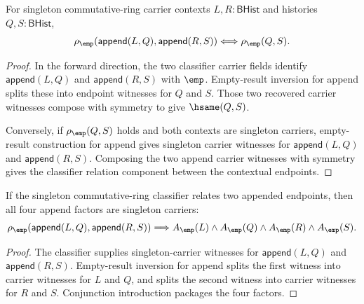 \begin{theorem}
\label{thm:commring-singleton-classifier-append-context-cancel}
For singleton commutative-ring carrier contexts $L,R:\mathsf{BHist}$ and
histories $Q,S:\mathsf{BHist}$,
$$
\rho_{\emp}(\mathsf{append}(L,Q),\mathsf{append}(R,S))
\Longleftrightarrow
\rho_{\emp}(Q,S).
$$
\end{theorem}
\begin{proof}
In the forward direction, the two classifier carrier fields identify
$\mathsf{append}(L,Q)$ and $\mathsf{append}(R,S)$ with $\emp$. Empty-result
inversion for append splits these into endpoint witnesses for $Q$ and $S$.
Those two recovered carrier witnesses compose with symmetry to give
$\hsame(Q,S)$.

Conversely, if $\rho_{\emp}(Q,S)$ holds and both contexts are singleton
carriers, empty-result construction for append gives singleton carrier
witnesses for $\mathsf{append}(L,Q)$ and $\mathsf{append}(R,S)$. Composing
the two append carrier witnesses with symmetry gives the classifier relation
component between the contextual endpoints.
\end{proof}

\begin{theorem}
\label{thm:commring-singleton-classifier-append-context-carrier-split}
If the singleton commutative-ring classifier relates two appended endpoints,
then all four append factors are singleton carriers:
$$
\rho_{\emp}(\mathsf{append}(L,Q),\mathsf{append}(R,S))
\Longrightarrow
A_{\emp}(L)\land A_{\emp}(Q)\land A_{\emp}(R)\land A_{\emp}(S).
$$
\end{theorem}
\begin{proof}
The classifier supplies singleton-carrier witnesses for
$\mathsf{append}(L,Q)$ and $\mathsf{append}(R,S)$. Empty-result inversion for
append splits the first witness into carrier witnesses for $L$ and $Q$, and
splits the second witness into carrier witnesses for $R$ and $S$. Conjunction
introduction packages the four factors.
\end{proof}

